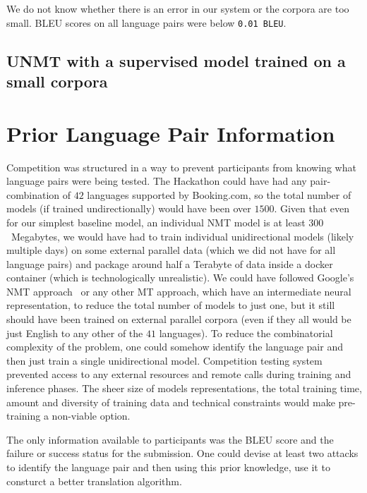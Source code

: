 \documentclass[]{article}
\begin{document}

We do not know whether there is an error in our system or the corpora are too small.
BLEU scores on all language pairs were below {\tt 0.01 BLEU}.

\subsection{\ac{UNMT} with a supervised model trained on a small corpora}
\label{sect:semi_unsupervised}

\section{Prior Language Pair Information}
\label{sect:nonoblivious}

Competition was structured in a way to prevent participants from knowing what language pairs were being tested.
The Hackathon could have had any pair-combination of $42$ languages supported by {{Booking.com}}, so the total number of models (if trained undirectionally) would have been over $1500$.
Given that even for our simplest baseline model, an individual \ac{NMT} model is at least $300$~Megabytes, we would have had to train individual unidirectional models (likely multiple days) on some external parallel data (which we did not have for all language pairs) and package around half a Terabyte of data inside a docker container (which is technologically unrealistic).
We could have followed Google's \ac{NMT} approach~\citep{johnson2016google} or any other \ac{MT} approach, which have an intermediate neural representation, to reduce the total number of models to just one, but it still should have been trained on external parallel corpora (even if they all would be just English to any other of the $41$ languages).
To reduce the combinatorial complexity of the problem, one could somehow identify the language pair and then just train a single unidirectional model.
Competition testing system prevented access to any external resources and remote calls during training and inference phases.
The sheer size of models representations, the total training time, amount and diversity of training data and technical constraints would make pre-training a non-viable option.

The only information available to participants was the BLEU score and the failure or success status for the submission.
One could devise at least two attacks to identify the language pair and then using this prior knowledge, use it to consturct a better translation algorithm.
\end{document}
